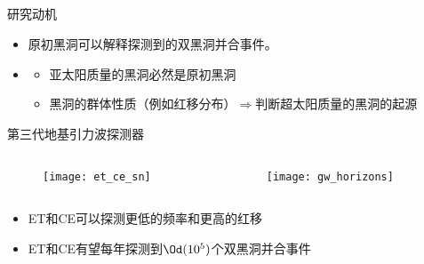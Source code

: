 \documentclass[xcolor={svgnames},compress]{beamer}
\let\olditem\item
\renewcommand{\item}{%
    \olditem\vspace{\fill}}
\begin{document}
\subsection{}
\begin{frame}{研究动机}
    
    \begin{itemize}
        \item 原初黑洞可以解释\lvc 探测到的双黑洞并合事件。
        \item {}
        \begin{itemize}
            \item 亚太阳质量的黑洞必然是原初黑洞
            \item 黑洞的群体性质（例如红移分布）$\Rightarrow$判断超太阳质量的黑洞的起源
        \end{itemize}
    \end{itemize}
\end{frame}
\begin{frame}{第三代地基引力波探测器}
    \begin{columns}
        \begin{column}{0.6\textwidth} 
            \begin{figure}[htbp!]
                \centering
                \texttt{[image: et\_ce\_sn]}
            \end{figure}
        \end{column}
        \begin{column}{0.52\textwidth} 
            \begin{figure}[htbp!]
                \centering
                \texttt{[image: gw\_horizons]}
            \end{figure}
        \end{column}
    \end{columns}
    \vspace{-1mm}
    \begin{itemize}
        \item ET和CE可以探测更低的频率和更高的红移
        \item ET和CE有望每年探测到$\Od(10^5)$个双黑洞并合事件 
    \end{itemize}
\end{frame}
\end{document}
